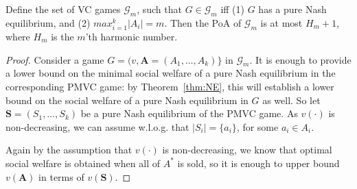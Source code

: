 \begin{theorem}
  Define the set of VC games $\mathcal{G}_{m}$, such
  that $G \in \mathcal{G}_m$ iff (1)
  $G$ has a pure Nash equilibrium, and
  (2) $max_{i=1}^k|A_i|=m$. Then the PoA of $\mathcal{G}_m$ is at most
  $H_m+1$, where $H_m$ is the $m$'th harmonic number.
\end{theorem}
\begin{proof}
  Consider a game $G=(v, \mathbf{A}=(A_1,\ldots,A_k)\}$ in  $\mathcal{G}_m$. It is enough to provide a lower bound on the minimal social
  welfare of a pure Nash equilibrium in the corresponding PMVC game: by
  Theorem~\ref{thm:NE}, this will establish a lower bound on the
  social welfare of a pure Nash equilibrium in $G$ as well. So let
  $\mathbf{S}=(S_1,\ldots,S_k)$ be a pure Nash equilibrium of the
  PMVC game. As $v(\cdot)$ is non-decreasing, we can assume w.l.o.g. that $|S_i|=\{a_i\}$, for some $a_i \in A_i$.

  Again by the assumption that $v(\cdot)$ is non-decreasing, we know
  that optimal social welfare is obtained when all of $A^*$ is
  sold, so it is enough to upper bound $v(\mathbf{A})$ in terms of $v(\mathbf{S})$.


\end{proof}
